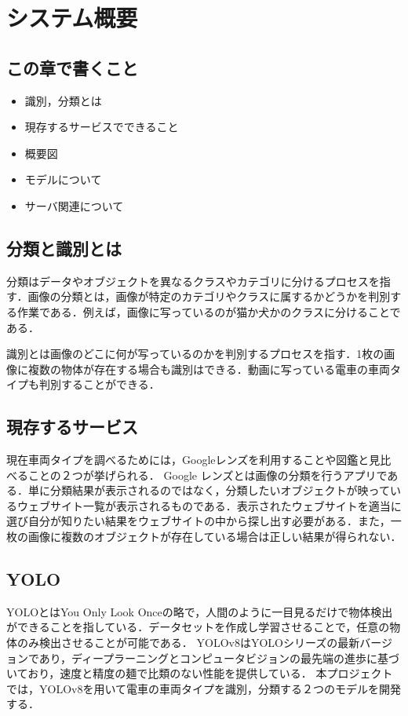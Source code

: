 

\chapter{システム概要}
\section{この章で書くこと}
\begin{itemize}
	\item 識別，分類とは
	\item 現存するサービスでできること
	\item 概要図
	\item モデルについて
	\item サーバ関連について
\end{itemize}
\section{分類と識別とは}
分類はデータやオブジェクトを異なるクラスやカテゴリに分けるプロセスを指す．画像の分類とは，画像が特定のカテゴリやクラスに属するかどうかを判別する作業である．例えば，画像に写っているのが猫か犬かのクラスに分けることである．

識別とは画像のどこに何が写っているのかを判別するプロセスを指す．1枚の画像に複数の物体が存在する場合も識別はできる．動画に写っている電車の車両タイプも判別することができる．



\section{現存するサービス}
現在車両タイプを調べるためには，Googleレンズを利用することや図鑑と見比べることの２つが挙げられる．
Google レンズとは画像の分類を行うアプリである．単に分類結果が表示されるのではなく，分類したいオブジェクトが映っているウェブサイト一覧が表示されるものである．表示されたウェブサイトを適当に選び自分が知りたい結果をウェブサイトの中から探し出す必要がある．また，一枚の画像に複数のオブジェクトが存在している場合は正しい結果が得られない．


\section{YOLO}
YOLOとはYou Only Look Onceの略で，人間のように一目見るだけで物体検出ができることを指している\cite{bk1}．データセットを作成し学習させることで，任意の物体のみ検出させることが可能である．
YOLOv8はYOLOシリーズの最新バージョンであり，ディープラーニングとコンピュータビジョンの最先端の進歩に基づいており，速度と精度の麺で比類のない性能を提供している．
本プロジェクトでは，YOLOv8を用いて電車の車両タイプを識別，分類する２つのモデルを開発する．

